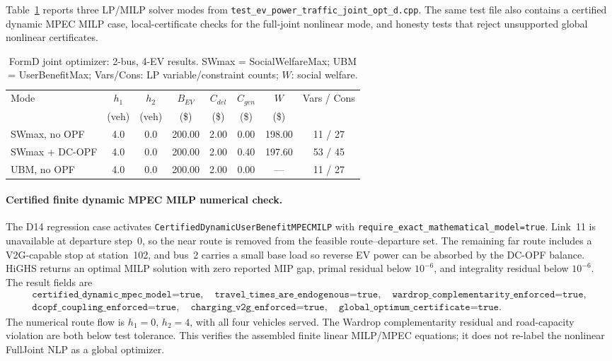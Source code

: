 Table~\ref{tab:nr-formd} reports three LP/MILP solver modes from
\texttt{test\_ev\_power\_traffic\_joint\_opt\_d.cpp}.  The same test file also
contains a certified dynamic MPEC MILP case, local-certificate checks for the
full-joint nonlinear mode, and honesty tests that reject unsupported global
nonlinear certificates.

\begin{table}[htbp]
\centering
\caption{FormD joint optimizer: 2-bus, 4-EV results.
  SWmax = SocialWelfareMax; UBM = UserBenefitMax;
  Vars/Cons: LP variable/constraint counts;
  $W$: social welfare.}
\label{tab:nr-formd}
\begin{tabular}{lccccccc}
\toprule
Mode & $h_1$ & $h_2$ & $B_{EV}$ & $C_{del}$ & $C_{gen}$ & $W$ &
  Vars / Cons \\
 & (veh) & (veh) & (\$) & (\$) & (\$) & (\$) & \\
\midrule
SWmax, no OPF  & 4.0 & 0.0 & 200.00 & 2.00 & 0.00 & 198.00 & 11 / 27 \\
SWmax + DC-OPF & 4.0 & 0.0 & 200.00 & 2.00 & 0.40 & 197.60 & 53 / 45 \\
UBM, no OPF    & 4.0 & 0.0 & 200.00 & 2.00 & 0.00 & ---    & 11 / 27 \\
\bottomrule
\end{tabular}
\end{table}

\paragraph{Certified finite dynamic MPEC MILP numerical check.}
The D14 regression case activates
\texttt{CertifiedDynamicUserBenefitMPECMILP} with
\texttt{require\_exact\_mathematical\_model=true}.  Link~11 is unavailable at
departure step~0, so the near route is removed from the feasible
route--departure set.  The remaining far route includes a V2G-capable stop at
station~102, and bus~2 carries a small base load so reverse EV power can be
absorbed by the DC-OPF balance.  HiGHS returns an optimal MILP solution with
zero reported MIP gap, primal residual below \(10^{-6}\), and integrality
residual below \(10^{-6}\).  The result fields are
\[
\begin{gathered}
  \texttt{certified\_dynamic\_mpec\_model=true},\quad
  \texttt{travel\_times\_are\_endogenous=true},\quad
  \texttt{wardrop\_complementarity\_enforced=true},\\
  \texttt{dcopf\_coupling\_enforced=true},\quad
  \texttt{charging\_v2g\_enforced=true},\quad
  \texttt{global\_optimum\_certificate=true}.
\end{gathered}
\]
The numerical route flow is \(h_1=0\), \(h_2=4\), with all four vehicles
served.  The Wardrop complementarity residual and road-capacity violation are
both below test tolerance.  This verifies the assembled finite linear
MILP/MPEC equations; it does not re-label the nonlinear FullJoint NLP as a
global optimizer.

